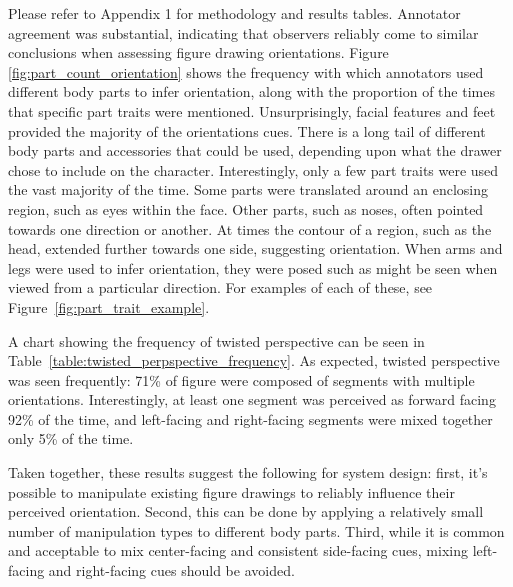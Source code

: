 Please refer to Appendix 1 for methodology and results tables.
Annotator agreement was substantial, indicating that observers reliably come to similar conclusions when assessing figure drawing orientations.
Figure \ref{fig:part_count_orientation} shows the frequency with which annotators used different body parts to infer orientation, along with the proportion of the times that specific part traits were mentioned.
Unsurprisingly, facial features and feet provided the majority of the orientations cues. 
There is a long tail of different body parts and accessories that could be used, depending upon what the drawer chose to include on the character.
Interestingly, only a few part traits were used the vast majority of the time.
Some parts were translated around an enclosing region, such as eyes within the face.
Other parts, such as noses, often pointed towards one direction or another.
At times the contour of a region, such as the head, extended further towards one side, suggesting orientation.
When arms and legs were used to infer orientation, they were posed such as might be seen when viewed from a particular direction. For examples of each of these, see Figure~\ref{fig:part_trait_example}.

A chart showing the frequency of twisted perspective can be seen in Table~\ref{table:twisted_perpspective_frequency}.
As expected, twisted perspective was seen frequently: 71\% of figure were composed of segments with multiple orientations.
Interestingly, at least one segment was perceived as forward facing 92\% of the time, and left-facing and right-facing segments were mixed together only 5\% of the time.

Taken together, these results suggest the following for system design:
first, it's possible to manipulate existing figure drawings to reliably influence their perceived orientation.
Second, this can be done by applying a relatively small number of manipulation types to different body parts.
Third, while it is common and acceptable to mix center-facing and consistent side-facing cues, mixing left-facing and right-facing cues should be avoided.




